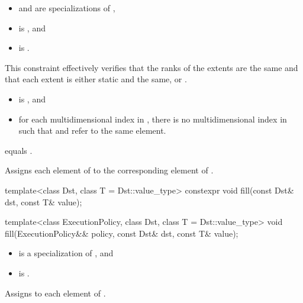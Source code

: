 \begin{itemdescr}
\pnum
\constraints
\begin{itemize}
\item
{} and  are specializations of ,
\item
{}
is , and
\item
{}
is .
\end{itemize}
\begin{note}
This constraint effectively verifies
that the ranks of the extents are the same and
that each extent is either static and the same,
or .
\end{note}

\pnum
\expects
\begin{itemize}
\item
{} is , and
\item
for each multidimensional index  in ,
there is no multidimensional index  in 
such that  and  refer to the same element.
\end{itemize}

\pnum
\hardexpects
{} equals .

\pnum
\effects
Assigns each element of  to the corresponding element of .
\end{itemdescr}

%
\begin{itemdecl}
template<class Dst, class T = Dst::value_type>
  constexpr void fill(const Dst& dst, const T& value);

template<class ExecutionPolicy, class Dst, class T = Dst::value_type>
  void fill(ExecutionPolicy&& policy, const Dst& dst, const T& value);
\end{itemdecl}

\begin{itemdescr}
\pnum
\constraints
\begin{itemize}
\item
{} is a specialization of , and
\item
{} is .
\end{itemize}

\pnum
\effects
Assigns  to each element of .
\end{itemdescr}
